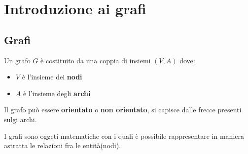 \section{Introduzione ai grafi}

\subsection{Grafi}

Un grafo $G$ è costituito da una coppia di insiemi $(V, A)$ dove:
\begin{itemize}
    \item $V$ è l'insieme dei \textbf{nodi}
    \item $A$ è l'insieme degli \textbf{archi}
\end{itemize}

Il grafo può essere \textbf{orientato} o \textbf{non orientato}, si capisce dalle frecce presenti sulgi archi.

I grafi sono oggeti matematiche con i quali è possibile rappresentare in maniera astratta le relazioni fra le entità(nodi).

